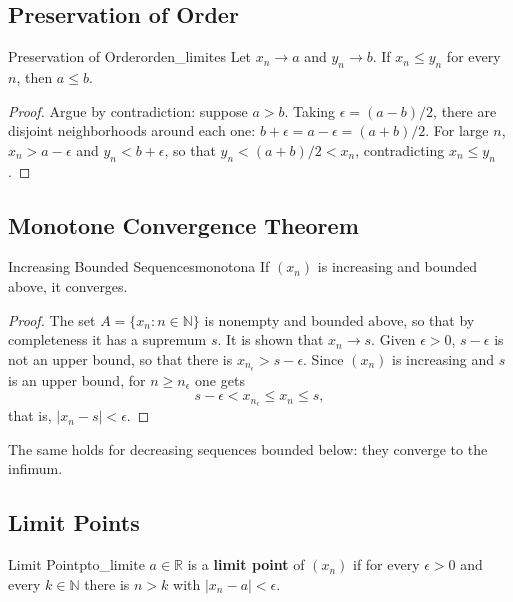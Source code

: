 \documentclass[11pt, a4paper]{article}
\begin{document}
\subsection{Preservation of Order}

\begin{proposicion}{Preservation of Order}{orden_limites}
Let $x_n \to a$ and $y_n \to b$. If $x_n \le y_n$ for every $n$, then $a \le b$.
\end{proposicion}

\begin{proof}
Argue by contradiction: suppose $a > b$. Taking $\epsilon = (a-b)/2$, there are disjoint neighborhoods around
each one: $b + \epsilon = a - \epsilon = (a+b)/2$. For large $n$, $x_n > a - \epsilon$ and
$y_n < b + \epsilon$, so that $y_n < (a+b)/2 < x_n$, contradicting $x_n \le y_n$.
\end{proof}

\subsection{Monotone Convergence Theorem}

\begin{teorema}{Increasing Bounded Sequences}{monotona}
If $(x_n)$ is increasing and bounded above, it converges.
\end{teorema}

\begin{proof}
The set $A = \{x_n : n \in \mathbb{N}\}$ is nonempty and bounded above, so that by
completeness it has a supremum $s$. It is shown that $x_n \to s$. Given $\epsilon > 0$, $s - \epsilon$ is not an
upper bound, so that there is $x_{n_\epsilon} > s - \epsilon$. Since $(x_n)$ is increasing and $s$ is an
upper bound, for $n \ge n_\epsilon$ one gets
$$ s - \epsilon < x_{n_\epsilon} \le x_n \le s, $$
that is, $|x_n - s| < \epsilon$.
\end{proof}

The same holds for decreasing sequences bounded below: they converge to the infimum.

\subsection{Limit Points}

\begin{definicion}{Limit Point}{pto_limite}
$a \in \mathbb{R}$ is a \textbf{limit point} of $(x_n)$ if for every $\epsilon > 0$ and every
$k \in \mathbb{N}$ there is $n > k$ with $|x_n - a| < \epsilon$.
\end{definicion}
\end{document}

